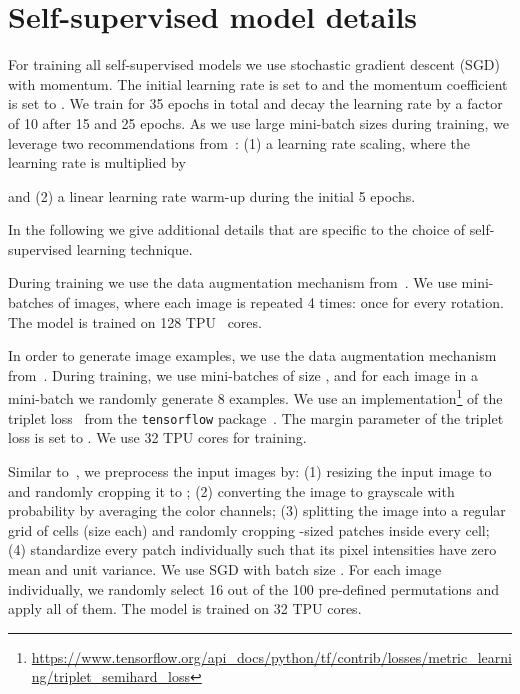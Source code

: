 \documentclass[10pt,twocolumn,letterpaper]{article}
\newcommand{\PAR}[1]{\vskip4pt \noindent {\bf #1~}}
\begin{document}
\section{Self-supervised model details}

For training all self-supervised models we use stochastic gradient descent (SGD) with momentum.
The initial learning rate is set to  and the momentum coefficient is set to .
We train for 35 epochs in total and decay the learning rate by a factor of 10 after 15 and 25 epochs.
As we use large mini-batch sizes  during training, we leverage two recommendations from~\cite{goyal2017accurate}:
(1) a learning rate scaling, where the learning rate is multiplied by

and (2) a linear learning rate warm-up during the initial 5 epochs.

In the following we give additional details that are specific to the choice of self-supervised learning technique.

\PAR{Rotation:} During training we use the data augmentation mechanism from~\cite{szegedy2015going}. 
We use mini-batches of  images, where each image is repeated 4 times: once for every rotation. 
The model is trained on 128 TPU~\cite{jouppi2017datacenter} cores.

\PAR{Exemplar:} In order to generate image examples, we use the data augmentation mechanism from~\cite{szegedy2015going}.
During training, we use mini-batches of size , and
for each image in a mini-batch we randomly generate 8 examples.
We use an implementation\footnote{\url{https://www.tensorflow.org/api_docs/python/tf/contrib/losses/metric_learning/triplet_semihard_loss}} of the triplet loss~\cite{schroff2015facenet} from the \texttt{tensorflow} package~\cite{abadi2016tensorflow}.
The margin parameter of the triplet loss is set to .
We use 32 TPU cores for training.

\PAR{Jigsaw:} Similar to~\cite{noroozi2016unsupervised}, we preprocess the input images by:
(1) resizing the input image to  and randomly cropping it to ;
(2) converting the image to grayscale with probability  by averaging the color channels;
(3) splitting the image into a  regular grid of cells (size  each) and randomly cropping -sized patches inside every cell; 
(4) standardize every patch individually such that its pixel intensities have zero mean and unit variance.
We use SGD with batch size .
For each image individually, we randomly select 16 out of the 100 pre-defined permutations and apply all of them.
The model is trained on 32 TPU cores.
\end{document}
